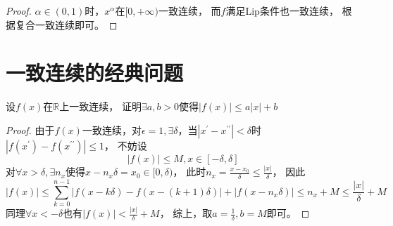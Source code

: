 \begin{proof}
  $\alpha \in (0,1)$时，$x^{\alpha}$在$[0,+\infty)$一致连续，
  而$f$满足Lip条件也一致连续，
  根据复合一致连续即可。
\end{proof}






\section{一致连续的经典问题}


\begin{exercise}
  设$f(x)$在$\mathbb{R}$上一致连续，
  证明$\exists a,b > 0$使得$|f(x)| \leq a|x| + b$
\end{exercise}

\begin{proof}
  由于$f(x)$一致连续，对$\epsilon = 1, \exists \delta$，当$|x^{\prime} - x^{\prime\prime}| < \delta$时
  $|f(x^{\prime}) - f(x^{\prime\prime})| \leq 1$，
  不妨设
  \begin{equation*}
    |f(x)| \leq M, x \in [-\delta, \delta]
  \end{equation*}
  对$\forall x > \delta, \exists n_x$使得$x - n_x\delta = x_0  \in [0,\delta)$，
  此时$n_x = \frac{x - x_0}{\delta} \leq \frac{|x|}{\delta}$，
  因此
  \begin{equation*}
    |f(x)| \leq \sum\limits_{k = 0}^{n-1}|f(x-k\delta) - f(x - (k+1)\delta)| + |f(x - n_x\delta)| \leq n_x + M \leq \frac{|x|}{\delta} + M
  \end{equation*}
  同理$\forall x < - \delta$也有$|f(x)| < \frac{|x|}{\delta} + M$，
  综上，取$a = \frac{1}{\delta}, b = M$即可。
\end{proof}












